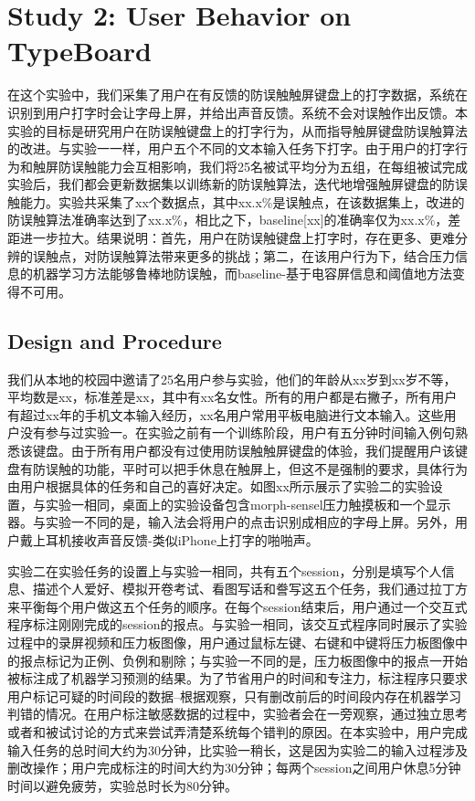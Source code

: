 \section{Study 2: User Behavior on TypeBoard}

在这个实验中，我们采集了用户在有反馈的防误触触屏键盘上的打字数据，系统在识别到用户打字时会让字母上屏，并给出声音反馈。系统不会对误触作出反馈。本实验的目标是研究用户在防误触键盘上的打字行为，从而指导触屏键盘防误触算法的改进。与实验一一样，用户五个不同的文本输入任务下打字。由于用户的打字行为和触屏防误触能力会互相影响，我们将25名被试平均分为五组，在每组被试完成实验后，我们都会更新数据集以训练新的防误触算法，迭代地增强触屏键盘的防误触能力。实验共采集了xx个数据点，其中xx.x\%是误触点，在该数据集上，改进的防误触算法准确率达到了xx.x\%，相比之下，baseline[xx]的准确率仅为xx.x\%，差距进一步拉大。结果说明：首先，用户在防误触键盘上打字时，存在更多、更难分辨的误触点，对防误触算法带来更多的挑战；第二，在该用户行为下，结合压力信息的机器学习方法能够鲁棒地防误触，而baseline-基于电容屏信息和阈值地方法变得不可用。

\subsection{Design and Procedure}

我们从本地的校园中邀请了25名用户参与实验，他们的年龄从xx岁到xx岁不等，平均数是xx，标准差是xx，其中有xx名女性。所有的用户都是右撇子，所有用户有超过xx年的手机文本输入经历，xx名用户常用平板电脑进行文本输入。这些用户没有参与过实验一。在实验之前有一个训练阶段，用户有五分钟时间输入例句熟悉该键盘。由于所有用户都没有过使用防误触触屏键盘的体验，我们提醒用户该键盘有防误触的功能，平时可以把手休息在触屏上，但这不是强制的要求，具体行为由用户根据具体的任务和自己的喜好决定。如图xx所示展示了实验二的实验设置，与实验一相同，桌面上的实验设备包含morph-sensel压力触摸板和一个显示器。与实验一不同的是，输入法会将用户的点击识别成相应的字母上屏。另外，用户戴上耳机接收声音反馈-类似iPhone上打字的啪啪声。

实验二在实验任务的设置上与实验一相同，共有五个session，分别是填写个人信息、描述个人爱好、模拟开卷考试、看图写话和誊写这五个任务，我们通过拉丁方来平衡每个用户做这五个任务的顺序。在每个session结束后，用户通过一个交互式程序标注刚刚完成的session的报点。与实验一相同，该交互式程序同时展示了实验过程中的录屏视频和压力板图像，用户通过鼠标左键、右键和中键将压力板图像中的报点标记为正例、负例和剔除；与实验一不同的是，压力板图像中的报点一开始被标注成了机器学习预测的结果。为了节省用户的时间和专注力，标注程序只要求用户标记可疑的时间段的数据--根据观察，只有删改前后的时间段内存在机器学习判错的情况。在用户标注敏感数据的过程中，实验者会在一旁观察，通过独立思考或者和被试讨论的方式来尝试弄清楚系统每个错判的原因。在本实验中，用户完成输入任务的总时间大约为30分钟，比实验一稍长，这是因为实验二的输入过程涉及删改操作；用户完成标注的时间大约为30分钟；每两个session之间用户休息5分钟时间以避免疲劳，实验总时长为80分钟。

